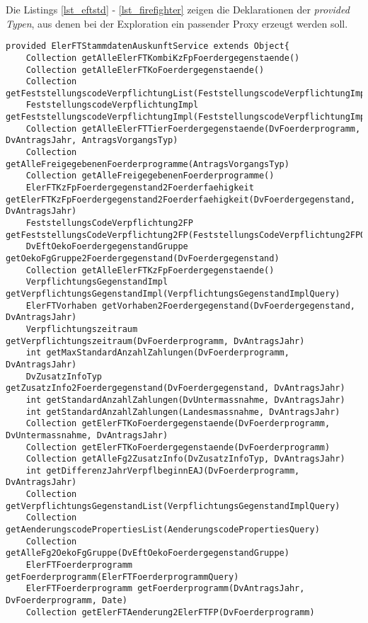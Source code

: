 \noindent
Die Listings \ref{lst_eftstd} - \ref{lst_firefighter} zeigen die Deklarationen der \emph{provided Typen}, aus denen bei der Exploration ein passender Proxy erzeugt werden soll.
\begin{lstlisting}[style = dsl, caption = Deklaration von ElerFTStammdatenAuskunftService, captionpos = b, label = lst_eftstd]
provided ElerFTStammdatenAuskunftService extends Object{
	Collection getAlleElerFTKombiKzFpFoerdergegenstaende()
	Collection getAlleElerFTKoFoerdergegenstaende()
	Collection getFeststellungscodeVerpflichtungList(FeststellungscodeVerpflichtungImplQuery)
	FeststellungscodeVerpflichtungImpl getFeststellungscodeVerpflichtungImpl(FeststellungscodeVerpflichtungImplQuery)
	Collection getAlleElerFTTierFoerdergegenstaende(DvFoerderprogramm, DvAntragsJahr, AntragsVorgangsTyp)
	Collection getAlleFreigegebenenFoerderprogramme(AntragsVorgangsTyp)
	Collection getAlleFreigegebenenFoerderprogramme()
	ElerFTKzFpFoerdergegenstand2Foerderfaehigkeit getElerFTKzFpFoerdergegenstand2Foerderfaehigkeit(DvFoerdergegenstand, DvAntragsJahr)
	FeststellungsCodeVerpflichtung2FP getFeststellungsCodeVerpflichtung2FP(FeststellungsCodeVerpflichtung2FPQuery)
	DvEftOekoFoerdergegenstandGruppe getOekoFgGruppe2Foerdergegenstand(DvFoerdergegenstand)
	Collection getAlleElerFTKzFpFoerdergegenstaende()
	VerpflichtungsGegenstandImpl getVerpflichtungsGegenstandImpl(VerpflichtungsGegenstandImplQuery)
	ElerFTVorhaben getVorhaben2Foerdergegenstand(DvFoerdergegenstand, DvAntragsJahr)
	Verpflichtungszeitraum getVerpflichtungszeitraum(DvFoerderprogramm, DvAntragsJahr)
	int getMaxStandardAnzahlZahlungen(DvFoerderprogramm, DvAntragsJahr)
	DvZusatzInfoTyp getZusatzInfo2Foerdergegenstand(DvFoerdergegenstand, DvAntragsJahr)
	int getStandardAnzahlZahlungen(DvUntermassnahme, DvAntragsJahr)
	int getStandardAnzahlZahlungen(Landesmassnahme, DvAntragsJahr)
	Collection getElerFTKoFoerdergegenstaende(DvFoerderprogramm, DvUntermassnahme, DvAntragsJahr)
	Collection getElerFTKoFoerdergegenstaende(DvFoerderprogramm)
	Collection getAlleFg2ZusatzInfo(DvZusatzInfoTyp, DvAntragsJahr)
	int getDifferenzJahrVerpflbeginnEAJ(DvFoerderprogramm, DvAntragsJahr)
	Collection getVerpflichtungsGegenstandList(VerpflichtungsGegenstandImplQuery)
	Collection getAenderungscodePropertiesList(AenderungscodePropertiesQuery)
	Collection getAlleFg2OekoFgGruppe(DvEftOekoFoerdergegenstandGruppe)
	ElerFTFoerderprogramm getFoerderprogramm(ElerFTFoerderprogrammQuery)
	ElerFTFoerderprogramm getFoerderprogramm(DvAntragsJahr, DvFoerderprogramm, Date)
	Collection getElerFTAenderung2ElerFTFP(DvFoerderprogramm)

\end{lstlisting}
